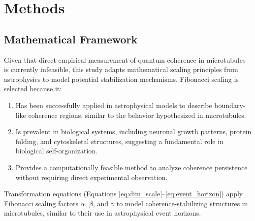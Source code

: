 \section{Methods}
\subsection{Mathematical Framework}
Given that direct empirical measurement of quantum coherence in microtubules is currently infeasible, this study adapts mathematical scaling principles from astrophysics to model potential stabilization mechanisms. Fibonacci scaling is selected because it:
\begin{enumerate}
    \item Has been successfully applied in astrophysical models to describe boundary-like coherence regions, similar to the behavior hypothesized in microtubules.
    \item Is prevalent in biological systems, including neuronal growth patterns, protein folding, and cytoskeletal structures, suggesting a fundamental role in biological self-organization.
    \item Provides a computationally feasible method to analyze coherence persistence without requiring direct experimental observation.
\end{enumerate}

Transformation equations (Equations \ref{eq:dim_scale}–\ref{eq:event_horizon}) apply Fibonacci scaling factors $\alpha$, $\beta$, and $\gamma$ to model coherence-stabilizing structures in microtubules, similar to their use in astrophysical event horizons.

